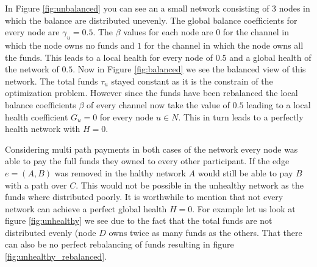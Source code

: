 \documentclass[a4paper]{paper}
\begin{document}
In Figure \ref{fig:unbalanced} you can see an a small network consisting of $3$ nodes in which the balance are distributed unevenly.
The global balance coefficients for every node are $\gamma_u=0.5$.
The $\beta$ values for each node are $0$ for the channel in which the node owns no funds and $1$ for the channel in which the node owns all the funds.
This leads to a local health for every node of $0.5$ and a global health of the network of $0.5$.
Now in Figure \ref{fig:balanced} we see the balanced view of this network.
The total funds $\tau_u$ stayed constant as it is the constrain of the optimization problem.
However since the funds have been rebalanced the local balance coefficients $\beta$ of every channel now take the value of $0.5$ leading to a local health coefficient $G_u=0$ for every node $u\in N$.
This in turn leads to a perfectly health network with $H=0$.

Considering multi path payments in both cases of the network every node was able to pay the full funds they owned to every other participant.
If the edge $e=(A,B)$ was removed in the halthy network $A$ would still be able to pay $B$ with a path over $C$.
This would not be possible in the unhealthy network as the funds where distributed poorly.
It is worthwhile to mention that not every network can achieve a perfect global health $H=0$.
For example let us look at figure \ref{fig:unhealthy} we see due to the fact that the total funds are not distributed evenly (node $D$ owns twice as many funds as the others.
That there can also be no perfect rebalancing of funds resulting in figure \ref{fig:unhealthy_rebalanced}.
\end{document}
